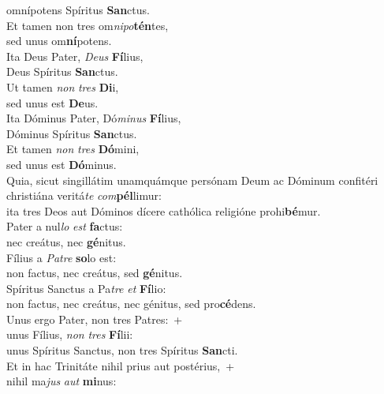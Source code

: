 \oddverse omnípotens Spíritus \textbf{San}ctus.\\
\evenverse Et tamen non tres om\textit{ni}\textit{po}\textbf{tén}tes,~\*\\
\evenverse sed unus om\textbf{ní}potens.\\
\oddverse Ita Deus Pater, \textit{De}\textit{us} \textbf{Fí}lius,~\*\\
\oddverse Deus Spíritus \textbf{San}ctus.\\
\evenverse Ut tamen \textit{non} \textit{tres} \textbf{Di}i,~\*\\
\evenverse sed unus est \textbf{De}us.\\
\oddverse Ita Dóminus Pater, Dó\textit{mi}\textit{nus} \textbf{Fí}lius,~\*\\
\oddverse Dóminus Spíritus \textbf{San}ctus.\\
\evenverse Et tamen \textit{non} \textit{tres} \textbf{Dó}mini,~\*\\
\evenverse sed unus est \textbf{Dó}minus.\\
\oddverse Quia, sicut singillátim unamquámque persónam Deum ac Dóminum confitéri christiána veritá\textit{te} \textit{com}\textbf{pél}limur:~\*\\
\oddverse ita tres Deos aut Dóminos dícere cathólica religióne prohi\textbf{bé}mur.\\
\evenverse Pater a nul\textit{lo} \textit{est} \textbf{fa}ctus:~\*\\
\evenverse nec creátus, nec \textbf{gé}nitus.\\
\oddverse Fílius a \textit{Pa}\textit{tre} \textbf{so}lo est:~\*\\
\oddverse non factus, nec creátus, sed \textbf{gé}nitus.\\
\evenverse Spíritus Sanctus a Pa\textit{tre} \textit{et} \textbf{Fí}lio:~\*\\
\evenverse non factus, nec creátus, nec génitus, sed pro\textbf{cé}dens.\\
\oddverse Unus ergo Pater, non tres Patres:~+\\
\oddverse  unus Fílius, \textit{non} \textit{tres} \textbf{Fí}lii:~\*\\
\oddverse unus Spíritus Sanctus, non tres Spíritus \textbf{San}cti.\\
\evenverse Et in hac Trinitáte nihil prius aut postérius,~+\\
\evenverse  nihil ma\textit{jus} \textit{aut} \textbf{mi}nus:~\*\\
